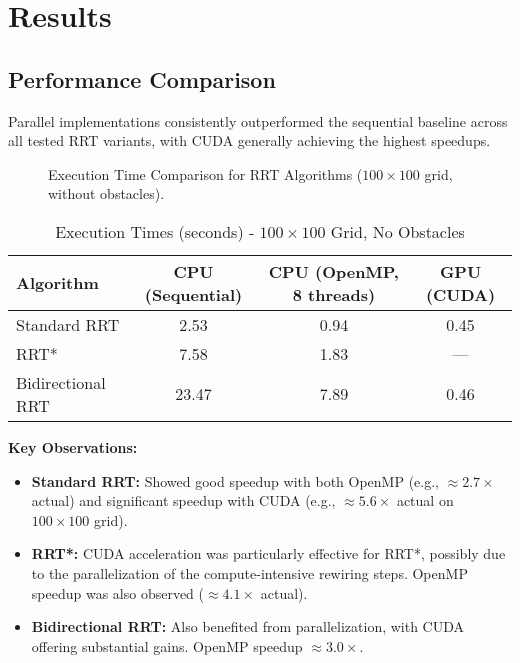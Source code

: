 \documentclass{article}
\begin{document}
\section{Results}

\subsection{Performance Comparison}
Parallel implementations consistently outperformed the sequential baseline across all tested RRT variants, with CUDA generally achieving the highest speedups.

\begin{figure}[h]
    \centering
    \caption{Execution Time Comparison for RRT Algorithms ($100 \times 100$ grid, without obstacles).}
    \label{fig:timing_comp}
\end{figure}

\begin{table}[h]
    \centering
    \caption{Execution Times (seconds) - $100 \times 100$ Grid, No Obstacles}
    \label{tab:times_100}
    \begin{tabular}{lccc}
        \toprule
        Algorithm         & CPU (Sequential) & CPU (OpenMP, 8 threads) & GPU (CUDA) \\
        \midrule
        Standard RRT      & 2.53             & 0.94                    & 0.45       \\
        RRT* & 7.58             & 1.83                    & ---        \\ %
        Bidirectional RRT & 23.47            & 7.89                    & 0.46       \\
        \bottomrule
    \end{tabular}
\end{table}

\textbf{Key Observations:}
\begin{itemize}
    \item \textbf{Standard RRT:} Showed good speedup with both OpenMP (e.g., $\approx 2.7 \times$ actual) and significant speedup with CUDA (e.g., $\approx 5.6 \times$ actual on $100 \times 100$ grid).
    \item \textbf{RRT*:} CUDA acceleration was particularly effective for RRT*, possibly due to the parallelization of the compute-intensive rewiring steps. OpenMP speedup was also observed ($\approx 4.1 \times$ actual).
    \item \textbf{Bidirectional RRT:} Also benefited from parallelization, with CUDA offering substantial gains. OpenMP speedup $\approx 3.0 \times$.
\end{itemize}
\end{document}
